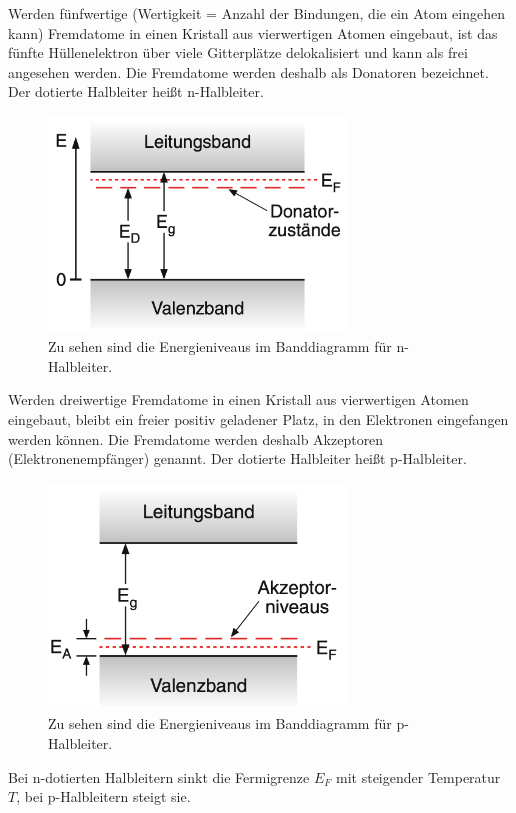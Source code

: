 Werden fünfwertige (Wertigkeit = Anzahl der Bindungen, die ein Atom eingehen kann) Fremdatome in einen Kristall aus vierwertigen Atomen eingebaut, ist das fünfte Hüllenelektron über viele Gitterplätze delokalisiert und kann als frei angesehen werden. Die Fremdatome werden deshalb als Donatoren bezeichnet. Der dotierte Halbleiter heißt n-Halbleiter. \cite{demtroeder}
\begin{figure}
    \centering
    \includegraphics[width=8cm]{fotos/Donator.png}
    \caption{Zu sehen sind die Energieniveaus im Banddiagramm für n-Halbleiter. \cite{demtroeder}}
    \label{fig:donator}
\end{figure}


Werden dreiwertige Fremdatome in einen Kristall aus vierwertigen Atomen eingebaut, bleibt ein freier positiv geladener Platz, in den Elektronen eingefangen werden können. Die Fremdatome werden deshalb Akzeptoren (Elektronenempfänger) genannt. Der dotierte Halbleiter heißt p-Halbleiter. \cite{demtroeder} 
\begin{figure}
    \centering
    \includegraphics[width=8cm]{fotos/Akzeptor.png}
    \caption{Zu sehen sind die Energieniveaus im Banddiagramm für p-Halbleiter. \cite{demtroeder}}
    \label{fig:akzeptor}
\end{figure}

Bei n-dotierten Halbleitern sinkt die Fermigrenze $E_F$ mit steigender Temperatur $T$, bei p-Halbleitern steigt sie. \cite{demtroeder}

